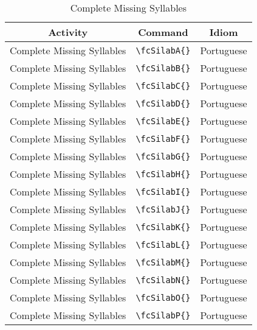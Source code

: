 \documentclass[x11names]{article}
\begin{document}
\begin{table}[H]
    \centering
    \begin{tabular}{|c|c|c|}
    \hline
\textbf{Activity} & \textbf{Command} & \textbf{Idiom} \\
\hline
Complete Missing Syllables& \verb|\fcSilabA{}|& Portuguese\\
\hline
Complete Missing Syllables& \verb|\fcSilabB{}|& Portuguese\\
\hline
Complete Missing Syllables& \verb|\fcSilabC{}|& Portuguese\\
\hline
Complete Missing Syllables& \verb|\fcSilabD{}|& Portuguese\\
\hline
Complete Missing Syllables& \verb|\fcSilabE{}|& Portuguese\\
\hline
Complete Missing Syllables& \verb|\fcSilabF{}|& Portuguese\\
\hline
Complete Missing Syllables& \verb|\fcSilabG{}|& Portuguese\\
\hline
Complete Missing Syllables& \verb|\fcSilabH{}|& Portuguese\\
\hline
Complete Missing Syllables& \verb|\fcSilabI{}|& Portuguese\\
\hline
Complete Missing Syllables& \verb|\fcSilabJ{}|& Portuguese\\
\hline
Complete Missing Syllables& \verb|\fcSilabK{}|& Portuguese\\
\hline
Complete Missing Syllables& \verb|\fcSilabL{}|& Portuguese\\
\hline
Complete Missing Syllables& \verb|\fcSilabM{}|& Portuguese\\
\hline
Complete Missing Syllables& \verb|\fcSilabN{}|& Portuguese\\
\hline
Complete Missing Syllables& \verb|\fcSilabO{}|& Portuguese\\
\hline
Complete Missing Syllables& \verb|\fcSilabP{}|& Portuguese\\
\hline
\end{tabular}
\caption{Complete Missing Syllables}
\label{Activies1}
\end{table}

\newpage

\fcSilabA{}

\newpage

\fcSilabB{}

\newpage

\fcSilabC{}

\newpage

\fcSilabD{}

\newpage
\end{document}
